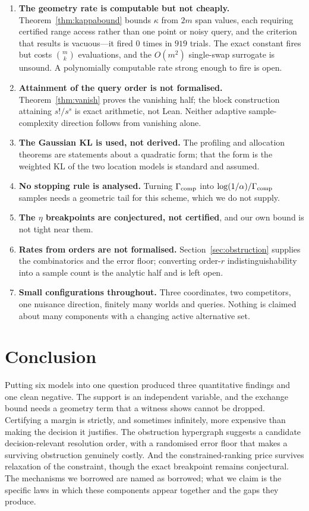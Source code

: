 \begin{enumerate}
\item[1)] \textbf{The geometry rate is computable but not cheaply.}
Theorem~\ref{thm:kappabound} bounds $\kappa$ from $2m$ span values, each requiring certified range access rather than one point or noisy query, and the criterion that
results is vacuous---it fired $0$ times in $919$ trials. The exact constant fires but costs
$\binom{m}{k}$ evaluations, and the $O(m^{2})$ single-swap surrogate is unsound. A
polynomially computable rate strong enough to fire is open.
\item[2)] \textbf{Attainment of the query order is not formalised.} Theorem~\ref{thm:vanish}
proves the vanishing half; the block construction attaining $s!/s^{s}$ is exact arithmetic,
not Lean. Neither adaptive sample-complexity direction follows from vanishing alone.
\item[3)] \textbf{The Gaussian KL is used, not derived.} The profiling and allocation
theorems are statements about a quadratic form; that the form is the weighted KL of the two
location models is standard and assumed.
\item[4)] \textbf{No stopping rule is analysed.} Turning $\Gamma_{\rm comp}$ into
$\log(1/\alpha)/\Gamma_{\rm comp}$ samples needs a geometric tail for this scheme, which we
do not supply.
\item[5)] \textbf{The $\eta$ breakpoints are conjectured, not certified}, and our own bound is not
tight near them.
\item[6)] \textbf{Rates from orders are not formalised.} Section~\ref{sec:obstruction}
supplies the combinatorics and the error floor; converting order-$r$ indistinguishability
into a sample count is the analytic half and is left open.
\item[7)] \textbf{Small configurations throughout.} Three coordinates, two competitors, one
nuisance direction, finitely many worlds and queries. Nothing is claimed about many
components with a changing active alternative set.
\end{enumerate}

\section{Conclusion}

Putting six models into one question produced three quantitative findings and one clean
negative. The support is an independent variable, and the exchange bound needs a geometry
term that a witness shows cannot be dropped. Certifying a margin is strictly, and
sometimes infinitely, more expensive than making the decision it justifies. The obstruction hypergraph suggests a candidate decision-relevant resolution order,
with a randomised error floor that makes a surviving obstruction genuinely costly. And the
constrained-ranking price survives relaxation of the constraint, though the exact
breakpoint remains conjectural. The mechanisms we borrowed are named as
borrowed; what we claim is the specific laws in which these components appear together and
the gaps they produce.

